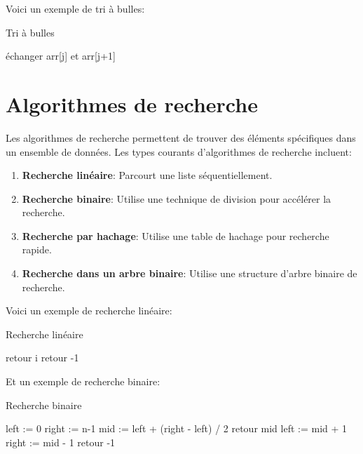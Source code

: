 Voici un exemple de tri à bulles:

\begin{algorithm}
	\caption{Tri à bulles}
	\begin{algorithmic}[1]
			\State échanger arr[j] et arr[j+1]
			\EndIf
			\EndFor
		\EndFor
	\end{algorithmic}
\end{algorithm}

\section{Algorithmes de recherche}

Les algorithmes de recherche permettent de trouver des éléments spécifiques dans un ensemble de données. Les types courants d'algorithmes de recherche incluent:

\begin{enumerate}
	\item \textbf{Recherche linéaire}: Parcourt une liste séquentiellement.
	\item \textbf{Recherche binaire}: Utilise une technique de division pour accélérer la recherche.
	\item \textbf{Recherche par hachage}: Utilise une table de hachage pour recherche rapide.
	\item \textbf{Recherche dans un arbre binaire}: Utilise une structure d'arbre binaire de recherche.
\end{enumerate}

Voici un exemple de recherche linéaire:

\begin{algorithm}
	\caption{Recherche linéaire}
	\begin{algorithmic}[1]
		\State retour i
		\EndIf
		\EndFor
		\State retour -1
	\end{algorithmic}
\end{algorithm}

Et un exemple de recherche binaire:

\begin{algorithm}
	\caption{Recherche binaire}
	\begin{algorithmic}[1]
		\State left := 0
		\State right := n-1
		\State mid := left + (right - left) / 2
		\State retour mid
		\State left := mid + 1
		\Else
		\State right := mid - 1
		\EndIf
		\EndWhile
		\State retour -1
	\end{algorithmic}
\end{algorithm}


